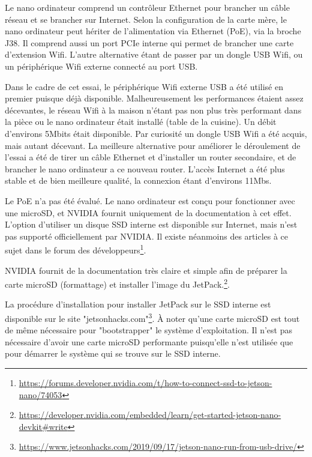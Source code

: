 \par Le nano ordinateur comprend un contrôleur Ethernet pour brancher un câble réseau et se brancher sur Internet. Selon la configuration de la carte mère, le nano ordinateur peut hériter de l'alimentation via Ethernet (PoE), via la broche J38. Il comprend aussi un port PCIe interne qui permet de brancher une carte d'extension Wifi. L'autre alternative étant de passer par un dongle USB Wifi, ou un périphérique Wifi externe connecté au port USB. 
\par Dans le cadre de cet essai, le périphérique Wifi externe USB a été utilisé en premier puisque déjà disponible. Malheureusement les performances étaient assez décevantes, le réseau Wifi à la maison n'étant pas non plus très performant dans la pièce ou le nano ordinateur était installé (table de la cuisine). Un débit d'environs 5Mbits était disponible. Par curiosité un dongle USB Wifi a été acquis, mais autant décevant. La meilleure alternative pour améliorer le déroulement de l'essai a été de tirer un câble Ethernet et d'installer un router secondaire, et de brancher le nano ordinateur a ce nouveau router. L'accès Internet a été plus stable et de bien meilleure qualité, la connexion étant d'environs 11Mbs. 
\par Le PoE n'a pas été évalué. 
Le nano ordinateur est conçu pour fonctionner avec une microSD, et NVIDIA fournit uniquement de la documentation à cet effet. L'option d'utiliser un disque SSD interne est disponible sur Internet, mais n'est pas supporté officiellement par NVIDIA. Il existe néanmoins des articles à ce sujet dans le forum des développeurs\footnote{\url{https://forums.developer.nvidia.com/t/how-to-connect-ssd-to-jetson-nano/74053}}. 
\par NVIDIA fournit de la documentation très claire et simple afin de préparer la carte microSD (formattage) et installer l'image du JetPack.\footnote{\url{https://developer.nvidia.com/embedded/learn/get-started-jetson-nano-devkit#write}}.
\par La procédure d'installation pour installer JetPack sur le SSD interne est disponible sur le site "jetsonhacks.com"\footnote{\url{https://www.jetsonhacks.com/2019/09/17/jetson-nano-run-from-usb-drive/}}. À noter qu'une carte microSD est tout de même nécessaire pour "bootstrapper" le système d'exploitation. Il n'est pas nécessaire d'avoir une carte microSD performante puisqu'elle n'est utilisée que pour démarrer le système qui se trouve sur le SSD interne. 
